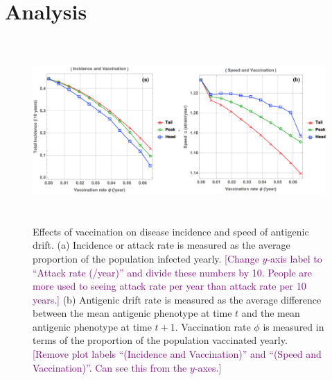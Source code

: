 \documentclass[preprint,12pt]{elsarticle}
\def\tbc#1{\textcolor{purple}{[#1]}}
\begin{document}
\section{Analysis}
\begin{figure}
  \centering
  \includegraphics[width=6in,height=2.75in]{figures/Veffect}
  \caption{Effects of vaccination on disease incidence and speed of antigenic drift.
  (a) Incidence or attack rate is measured as the average proportion of the population infected yearly.
  \tbc{Change $y$-axis label to ``Attack rate (/year)'' and divide these numbers by 10. People are more used to seeing attack rate per year than attack rate per 10 years.}
  (b) Antigenic drift rate is measured as the average difference between the mean antigenic phenotype at time \(t\) and the mean antigenic phenotype at time \(t+1\).
  Vaccination rate \(\phi\) is measured in terms of the proportion of the population vaccinated yearly.
  \tbc{Remove plot labels ``(Incidence and Vaccination)'' and ``(Speed and Vaccination)''. Can see this from the $y$-axes.}
  }
  \label{fig:Veffect}
\end{figure}
\end{document}
